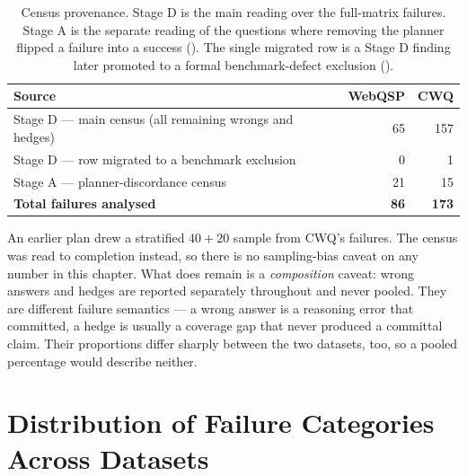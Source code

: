\begin{table}[!tb]
  \begin{center}
    \caption[Census provenance]{Census provenance. Stage D is the main reading
    over the full-matrix failures. Stage A is the separate reading of the
    questions where removing the planner flipped a failure into a success
    (). The single migrated row is a Stage D finding later
    promoted to a formal benchmark-defect exclusion
    ().}
    \label{tab:census-pop}
    \begin{tabular}{|l|r|r|}
      \hline
      \textbf{Source} & \textbf{WebQSP} & \textbf{CWQ} \\
      \hline
      Stage D --- main census (all remaining wrongs and hedges) & 65 & 157 \\
      Stage D --- row migrated to a benchmark exclusion & 0 & 1 \\
      Stage A --- planner-discordance census & 21 & 15 \\
      \hline
      \textbf{Total failures analysed} & \textbf{86} & \textbf{173} \\
      \hline
    \end{tabular}
  \end{center}
\end{table}

An earlier plan drew a stratified $40 + 20$ sample from CWQ's failures. The
census was read to completion instead, so there is no sampling-bias caveat on
any number in this chapter. What does remain is a \emph{composition} caveat:
wrong answers and hedges are reported separately throughout and never pooled.
They are different failure semantics --- a wrong answer is a reasoning error
that committed, a hedge is usually a coverage gap that never produced a
committal claim. Their proportions differ sharply between the two
datasets, too, so a pooled percentage would describe neither.

\section{Distribution of Failure Categories Across
Datasets}\label{sec:failure-distribution}

\begin{table}[!tbp]
  \begin{center}
    \caption[The merged failure histogram]{The merged failure histogram, $n =
    259$. Wrong and hedge are kept separate. Counts come from
    \textsf{scripts/synthesize\_census.py} over the three label sources of
    . The table body is generated from
    \textsf{results/phase4/thesis\_numbers.json}, so it cannot drift out of step
    with .}
    \label{tab:histogram}
    \small
    
  \end{center}
\end{table}

